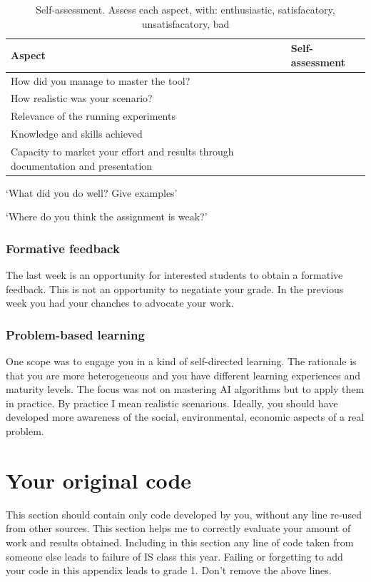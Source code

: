 \documentclass[a4paper,12pt]{report}
\begin{document}
\begin{table}
\begin{tabular}{p{8cm}l}
Aspect & Self-assessment\\ \hline
How did you manage to master the tool?& \\
How realistic was your scenario? & \\
Relevance of the running experiments &\\
Knowledge and skills achieved & \\ 
Capacity to market your effort and results through documentation and presentation& \\
\hline
\end{tabular}
\caption{Self-assessment. Assess each aspect, with: enthusiastic, satisfacatory, unsatisfacatory, bad} 
\end{table}

‘What did you do well? Give examples’

‘Where do you think the assignment is weak?’


\subsection{Formative feedback}
The last week is an opportunity for interested students to obtain 
a formative feedback. 
This is not an opportunity to negatiate your grade. 
In the previous week you had your chanches to advocate your work. 



\subsection{Problem-based learning}

One scope was to engage you in a kind of self-directed learning.
The rationale is that you are more heterogeneous and 
you have different learning experiences and maturity levels.
The focus was not on mastering AI algorithms but to apply them in practice. 
By practice I mean realistic scenarious.
Ideally, you should have developed more awareness of the social, 
environmental, economic aspects of a real problem. 


\appendix

\chapter{Your original code}
\label{app:code}
This section should contain only code developed by you, without any line re-used from other sources. 
This section helps me to correctly evaluate your amount of work and results obtained. 
Including in this section any line of code taken from someone else leads to failure of IS class this year.
Failing or forgetting to add your code in this appendix leads to grade 1.
Don't remove the above lines.
\end{document}
